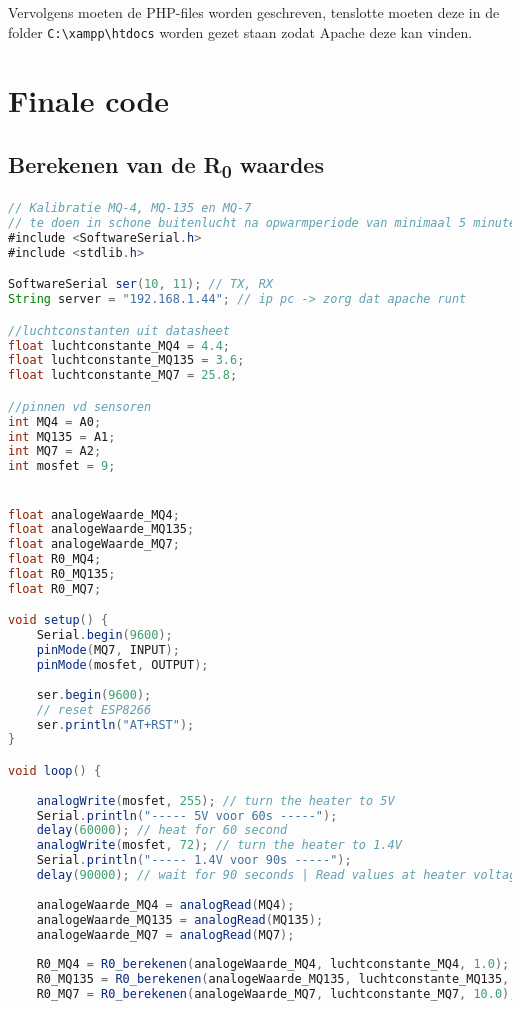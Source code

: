 Vervolgens moeten de PHP-files worden geschreven, tenslotte moeten deze in de folder \verb|C:\xampp\htdocs| worden gezet staan zodat Apache deze kan vinden.

\section{Finale code}
\label{sec:finale_code}

\subsection{Berekenen van de R\textsubscript{0} waardes}
\label{subsec:script_R0}

\begin{lstlisting}[language=Java,caption={Berekenen en verzenden van de R0 waardes}]
// Kalibratie MQ-4, MQ-135 en MQ-7
// te doen in schone buitenlucht na opwarmperiode van minimaal 5 minuten
#include <SoftwareSerial.h>
#include <stdlib.h>

SoftwareSerial ser(10, 11); // TX, RX
String server = "192.168.1.44"; // ip pc -> zorg dat apache runt

//luchtconstanten uit datasheet
float luchtconstante_MQ4 = 4.4;
float luchtconstante_MQ135 = 3.6;
float luchtconstante_MQ7 = 25.8;

//pinnen vd sensoren 
int MQ4 = A0;
int MQ135 = A1;
int MQ7 = A2;
int mosfet = 9;


float analogeWaarde_MQ4;
float analogeWaarde_MQ135;
float analogeWaarde_MQ7;
float R0_MQ4;
float R0_MQ135;
float R0_MQ7;

void setup() {
    Serial.begin(9600);
    pinMode(MQ7, INPUT);
    pinMode(mosfet, OUTPUT);
    
    ser.begin(9600);
    // reset ESP8266
    ser.println("AT+RST");
}

void loop() {
    
    analogWrite(mosfet, 255); // turn the heater to 5V
    Serial.println("----- 5V voor 60s -----");
    delay(60000); // heat for 60 second
    analogWrite(mosfet, 72); // turn the heater to 1.4V
    Serial.println("----- 1.4V voor 90s -----");
    delay(90000); // wait for 90 seconds | Read values at heater voltage 1.4V
    
    analogeWaarde_MQ4 = analogRead(MQ4);
    analogeWaarde_MQ135 = analogRead(MQ135);
    analogeWaarde_MQ7 = analogRead(MQ7);
    
    R0_MQ4 = R0_berekenen(analogeWaarde_MQ4, luchtconstante_MQ4, 1.0);
    R0_MQ135 = R0_berekenen(analogeWaarde_MQ135, luchtconstante_MQ135, 1.0);
    R0_MQ7 = R0_berekenen(analogeWaarde_MQ7, luchtconstante_MQ7, 10.0);
    

\end{lstlisting}
